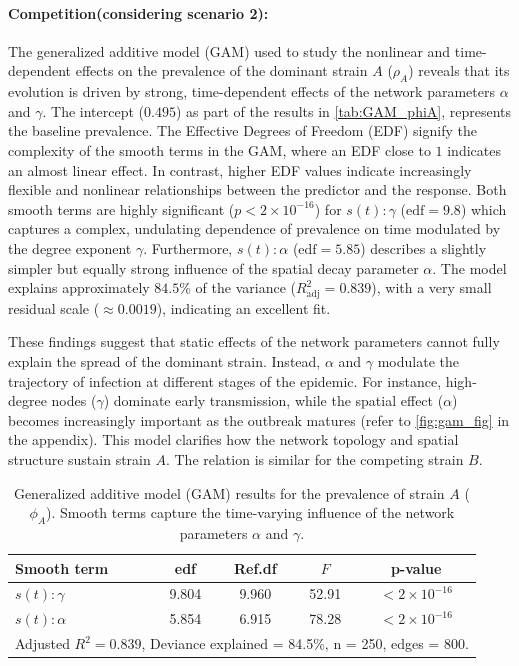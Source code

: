 \documentclass[a4paper,12pt]{scrartcl}
\theoremstyle{plain}%
\theoremstyle{definition}
\theoremstyle{remark}
\numberwithin{equation}{section}
\begin{document}
\paragraph{Competition(considering scenario 2):} 

The generalized additive model (GAM) used to study the nonlinear and time-dependent effects on the prevalence of the dominant strain \(A\) (\(\rho_A\)) reveals that its evolution is driven by strong, time-dependent effects of the network parameters \(\alpha\) and \(\gamma\). The intercept (\(0.495\)) as part of the results in \autoref{tab:GAM_phiA}, represents the baseline prevalence. 
The Effective Degrees of Freedom (EDF) signify the complexity of the smooth terms in the GAM, where an EDF close to $1$ indicates an almost linear effect. In contrast, higher EDF values indicate increasingly flexible and nonlinear relationships between the predictor and the response.
Both smooth terms are highly significant (\(p < 2\times10^{-16}\)) for 
\(s(t):\gamma\) (\(\mathrm{edf} = 9.8\)) which captures a complex, undulating dependence of prevalence on time modulated by the degree exponent \(\gamma\). Furthermore, \(s(t):\alpha\) (\(\mathrm{edf} = 5.85\)) describes a slightly simpler but equally strong influence of the spatial decay parameter \(\alpha\). The model explains approximately \(84.5\%\) of the variance (\(R^2_{\text{adj}} = 0.839\)), with a very small residual scale (\(\approx 0.0019\)), indicating an excellent fit.

These findings suggest that static effects of the network parameters cannot fully explain the spread of the dominant strain. Instead, \(\alpha\) and \(\gamma\) modulate the trajectory of infection at different stages of the epidemic. For instance, high-degree nodes (\(\gamma\)) dominate early transmission, while the spatial effect (\(\alpha\)) becomes increasingly important as the outbreak matures (refer to \autoref{fig:gam_fig} in the appendix). This model clarifies how the network topology and spatial structure sustain strain \(A\). The relation is similar for the competing strain \(B\). 

\begin{table}[ht]
\centering
\caption{Generalized additive model (GAM) results for the prevalence of strain \(A\) (\(\phi_A\)). 
Smooth terms capture the time-varying influence of the network parameters \(\alpha\) and \(\gamma\).}
\label{tab:GAM_phiA}
\begin{tabular}{lcccc}
\hline
Smooth term & edf & Ref.df & $F$ & p-value \\ \hline
$s(t):\gamma$ & 9.804 & 9.960 & 52.91 & $<2\times10^{-16}$ \\
$s(t):\alpha$ & 5.854 & 6.915 & 78.28 & $<2\times10^{-16}$ \\ \hline
\multicolumn{5}{l}{\footnotesize Adjusted $R^2 = 0.839$, Deviance explained = 84.5\%, n = 250, edges = 800.}
\end{tabular}
\end{table}
\end{document}

